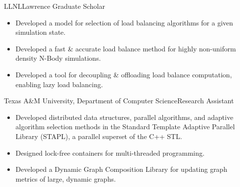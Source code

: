 		{LLNL}{Lawrence Graduate Scholar}{}{}
		{\begin{itemize}
            \item Developed a model for selection of load
                  balancing algorithms for a given simulation state.%
            \item Developed a fast \& accurate load balance method for highly non-uniform density N-Body simulations.
            \item Developed a tool for decoupling \& offloading load balance computation,
                  enabling lazy load balancing.%
		\end{itemize}}

		{Texas A\&M University, Department of Computer Science}{Research Assistant}{}{}
		{\begin{itemize}
			\item Developed distributed data structures, parallel algorithms,
				and adaptive algorithm selection methods
				in the Standard Template Adaptive Parallel Library (STAPL),
			  	a parallel superset of the C++ STL. %
			\item Designed lock-free containers for multi-threaded programming.
			\item Developed a Dynamic Graph Composition Library for updating graph metrics of large, dynamic graphs.
		\end{itemize}}

